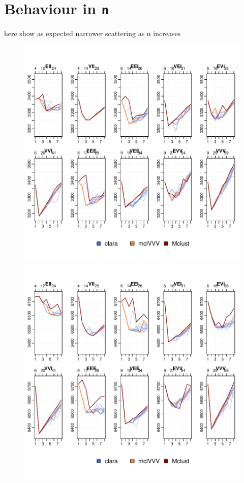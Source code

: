 \section{Behaviour in {\tt n}}

here show as expected narrower scattering as n increases


\begin{figure}[h!]
    \centering
    \begin{minipage}{0.45\textwidth}
        \centering
\includegraphics{chapter3-fig5fit}
    \end{minipage}
    \begin{minipage}{0.45\textwidth}
        \centering
\includegraphics{chapter3-fig10fit}
    \end{minipage}
\end{figure}

